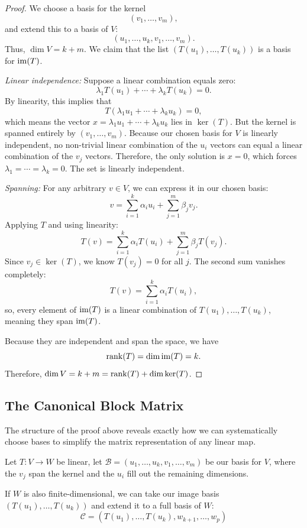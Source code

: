 \documentclass[../linear_algebra_and_groups.tex]{subfiles}
\begin{document}
\begin{proof}
    We choose a basis for the kernel
    \[ (v_1, \dots, v_m), \]
    and extend this to a basis of $V$:
    \[ (u_1, \dots, u_k, v_1, \dots, v_m). \]
    Thus, $\dim V = k + m$. We claim that the list $(T(u_1), \dots, T(u_k))$ is a basis for $\operatorname{im}(T)$.
    
    \textit{Linear independence:} Suppose a linear combination equals zero:
    \[ \lambda_1 T(u_1) + \cdots + \lambda_k T(u_k) = 0. \]
    By linearity, this implies that
    \[ T(\lambda_1 u_1 + \cdots + \lambda_k u_k) = 0, \]
    which means the vector $x = \lambda_1 u_1 + \cdots + \lambda_k u_k$ lies in $\ker(T)$. But the kernel is spanned entirely by $(v_1, \dots, v_m)$. Because our chosen basis for $V$ is linearly independent, no non-trivial linear combination of the $u_i$ vectors can equal a linear combination of the $v_j$ vectors. Therefore, the only solution is $x=0$, which forces $\lambda_1 = \cdots = \lambda_k = 0$. The set is linearly independent.

    \textit{Spanning:} For any arbitrary $v \in V$, we can express it in our chosen basis:
    \[ v = \sum_{i=1}^k \alpha_i u_i + \sum_{j=1}^m \beta_j v_j. \]
    Applying $T$ and using linearity:
    \[ T(v) = \sum_{i=1}^k \alpha_i T(u_i) + \sum_{j=1}^m \beta_j T(v_j). \]
    Since $v_j \in \ker(T)$, we know $T(v_j) = 0$ for all $j$. The second sum vanishes completely:
    \[ T(v) = \sum_{i=1}^k \alpha_i T(u_i), \]
    so, every element of $\operatorname{im}(T)$ is a linear combination of $T(u_1), \dots, T(u_k)$, meaning they span $\operatorname{im}(T)$.
    
    Because they are independent and span the space, we have \[\operatorname{rank}(T) = \dim \operatorname{im}(T) = k.\] 
    Therefore, $\dim V = k + m = \operatorname{rank}(T) + \dim \ker(T)$.
    \qedhere
\end{proof}

\subsection{The Canonical Block Matrix}

The structure of the proof above reveals exactly how we can systematically choose bases to simplify the matrix representation of any linear map.

Let $T:V\to W$ be linear, let $\mathcal{B} = (u_1,\dots,u_k,v_1,\dots,v_m)$ be our basis for $V$, where the $v_j$ span the kernel and the $u_i$ fill out the remaining dimensions.

If $W$ is also finite-dimensional, we can take our image basis $(T(u_1),\dots,T(u_k))$ and extend it to a full basis of $W$:
\[ \mathcal{C} = (T(u_1),\dots,T(u_k), w_{k+1},\dots,w_p) \]
\end{document}
